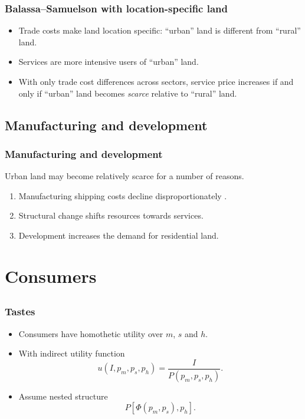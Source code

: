 \documentclass[compress,mathserif]{beamer}
\newcounter{perc}
\newcounter{percek}
\renewcommand{\time}[1]{\addtocounter{percek}{#1}}
\begin{document}
\begin{frame}\frametitle{Balassa--Samuelson with location-specific land}
\begin{itemize}
\item Trade costs make land location specific: ``urban'' land is different from ``rural'' land.
\item Services are more intensive users of ``urban'' land.
\item With only trade cost differences across sectors, service price increases if and only if ``urban'' land becomes \emph{scarce} relative to ``rural'' land.
\end{itemize}
\end{frame}

\subsection{Manufacturing and development}

\begin{frame}\frametitle{Manufacturing and development}
Urban land may become relatively scarce for a number of reasons. 
\begin{enumerate}
\item<1-> Manufacturing shipping costs decline disproportionately \hyperlink{PPF-location}{}.
\item<1-> Structural change shifts resources towards services.
\item<2-> Development increases the demand for residential land.
\end{enumerate}
\end{frame}
\time 1

\section{Consumers}
\subsection{}

\begin{frame}\frametitle{Tastes}
\begin{itemize}
    \item Consumers have homothetic utility over $m$, $s$ and $h$.
    \item With indirect utility function
    \[
    u(I,p_m,p_s,p_h) = \frac{I}{P(p_m,p_s,p_h)}.
    \]
    \item Assume nested structure
    \[
    P[\Phi(p_m,p_s),p_h].
    \]
\end{itemize}
\end{frame}
\end{document}
